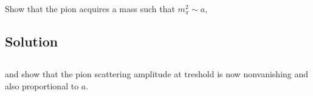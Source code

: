 \subsection{}
Show that the pion acquires a mass such that $m^2_\pi \sim a$, 

\subsection*{Solution}


\subsection{}
and show that the pion scattering amplitude at treshold is now nonvanishing and also proportional to $a$.
















